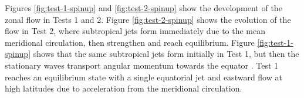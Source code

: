 Figures \ref{fig:test-1-spinup} and \ref{fig:test-2-spinup} show the development of the zonal flow in Tests 1 and 2. Figure \ref{fig:test-2-spinup} shows the evolution of the flow in Test 2, where subtropical jets form immediately due to the mean meridional circulation, then strengthen and reach equilibrium. Figure \ref{fig:test-1-spinup} shows that the same subtropical jets form initially in Test 1, but then the stationary waves transport angular momentum towards the equator \citep{showman2011superrotation}. Test 1 reaches an equilibrium state with a single equatorial jet and eastward flow at high latitudes due to acceleration from the meridional circulation.



%

